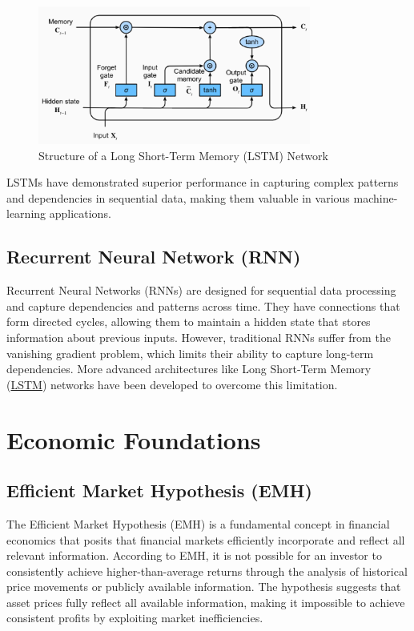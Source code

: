 \documentclass[a4paper,10pt]{article}
\begin{document}
\begin{figure}[ht]
  \centering
  \includegraphics[width=0.8\textwidth]{figure/lstm.png}
  \caption{Structure of a Long Short-Term Memory (LSTM) Network}
  \label{figure:lstm_structure}
\end{figure}

LSTMs have demonstrated superior performance in capturing complex patterns and dependencies in sequential data, making them valuable in various machine-learning applications.


\subsection{Recurrent Neural Network (RNN)}\label{appx:rnn}

Recurrent Neural Networks (RNNs) are designed for sequential data processing and capture dependencies and patterns across time. They have connections that form directed cycles, allowing them to maintain a hidden state that stores information about previous inputs. However, traditional RNNs suffer from the vanishing gradient problem, which limits their ability to capture long-term dependencies. More advanced architectures like Long Short-Term Memory (\hyperref[appx:lstm]{LSTM}) networks have been developed to overcome this limitation.

\section{Economic Foundations}

\subsection{Efficient Market Hypothesis (EMH)}\label{appx:emh}

The Efficient Market Hypothesis (EMH) is a fundamental concept in financial economics that posits that financial markets efficiently incorporate and reflect all relevant information. According to EMH, it is not possible for an investor to consistently achieve higher-than-average returns through the analysis of historical price movements or publicly available information. The hypothesis suggests that asset prices fully reflect all available information, making it impossible to achieve consistent profits by exploiting market inefficiencies.
\end{document}
